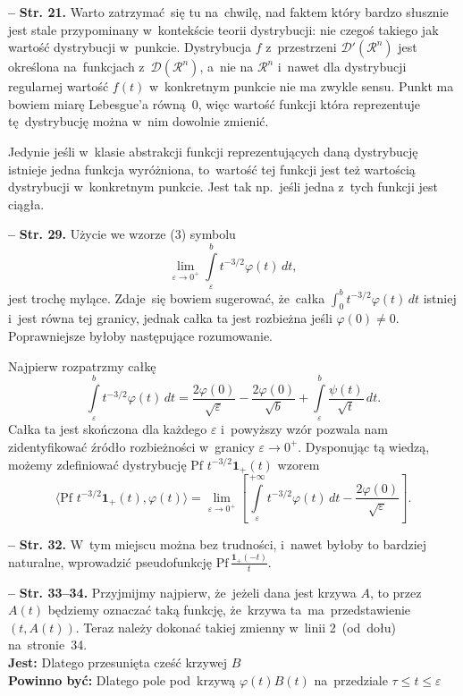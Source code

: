 \documentclass[a4paper,11pt]{article}
\newcommand{\fr}{\frac}
\newcommand{\mr}{\mathrm}
\newcommand{\mc}{\mathcal}
\newcommand{\mbf}{\mathbf}
\newcommand{\ra}{\rightarrow}
\newcommand{\veps}{\varepsilon}
\newcommand{\vp}{\varphi}
\newcommand{\D}{\mc{D}}
\newcommand{\Rc}{\mc{R}}
\newcommand{\Lim}{\lim\limits}
\newcommand{\Int}{\int\limits}
\newcommand{\lket}{\langle}
\newcommand{\rket}{\rangle}
\newcommand{\tb}{\textbf}
\newcommand{\noi}{\noindent}
\newcommand{\start}{\noi \tb{--} {}}
\newcommand{\Str}[1]{\tb{Str. #1.}}
\newcommand{\Jest}{\tb{Jest: }}
\newcommand{\Pow}{\tb{Powinno być: }}
\newcommand{\Pf}{\mr{Pf}\,}
\newcommand{\Rnc}{\Rc^{ n }}
\newcommand{\Hevp}{\mbf{1}_{ + }} %
\begin{document}
\start \Str{21} Warto zatrzymać~się tu na~chwilę, nad faktem który
bardzo słusznie jest stale przypominany w~kontekście teorii
dystrybucji: nie czegoś takiego jak wartość dystrybucji w~punkcie.
Dystrybucja $f$ z~przestrzeni $\D'( \Rnc )$ jest określona
na~funkcjach z~$\D( \Rnc )$, a~nie na $\Rnc$ i~nawet dla dystrybucji
regularnej wartość $f( t )$ w~konkretnym punkcie nie ma zwykle sensu.
Punkt ma bowiem miarę Lebesgue'a równą~0, więc wartość funkcji która
reprezentuje tę~dystrybucję można w~nim dowolnie zmienić.

Jedynie jeśli w~klasie abstrakcji funkcji reprezentujących daną
dystrybucję istnieje jedna funkcja wyróżniona, to~wartość tej funkcji
jest też wartością dystrybucji w~konkretnym punkcie. Jest tak
np.~jeśli jedna z~tych funkcji jest ciągła.

\start \Str{29} Użycie we wzorze (3) symbolu
\begin{equation}
  \label{eq:Zem-s01-01}
  \Lim_{ \veps \ra 0^{ + } } \Int_{ \veps }^{ b } t^{ -3/2 } \vp( t ) \, dt,
\end{equation}
jest trochę mylące. Zdaje~się bowiem sugerować, że~całka
$\int_{ 0 }^{ b } t^{ -3/2 } \vp( t ) \, dt$ istniej i~jest równa tej
granicy, jednak całka ta jest rozbieżna jeśli $\vp( 0 ) \neq 0$.
Poprawniejsze byłoby następujące
rozumowanie. %

Najpierw rozpatrzmy całkę
\begin{equation}
  \label{eq:Zem-s01-02}
  \Int_{ \veps }^{ b } t^{ -3/2 } \vp( t ) \, dt
  = \fr{ 2 \vp( 0 ) }{ \sqrt{ \veps } } - \fr{ 2 \vp( 0 ) }{ \sqrt{ b } }
  + \Int_{ \veps }^{ b } \fr{ \psi( t ) }{ \sqrt{ t } } \, dt.
\end{equation}
Całka ta jest skończona dla każdego $\veps$ i~powyższy wzór pozwala
nam zidentyfikować źródło rozbieżności w~granicy $\veps \ra 0^{ + }$.
Dysponując tą wiedzą, możemy zdefiniować dystrybucję
$\Pf \, t^{ -3/2 } \Hevp( t )$ wzorem
\begin{equation}
  \label{eq:Zem-s01-03}
  \lket \Pf \, t^{ -3/2 } \Hevp( t ), \vp( t ) \rket = \Lim_{ \veps \ra 0^{ + } }
  \left[ \Int_{ \veps }^{ +\infty } t^{ -3/2 } \vp( t ) \, dt
    - \fr{ 2 \vp( 0 ) }{ \sqrt{ \veps } } \right].
\end{equation}

\start \Str{32} W~tym miejscu można bez trudności, i~nawet byłoby to
bardziej naturalne, wprowadzić pseudofunkcję
$\Pf \fr{ \Hevp( -t )}{ t }$.

\start \Str{33--34} Przyjmijmy najpierw, że~jeżeli dana jest krzywa
$A$, to przez $A( t )$ będziemy oznaczać taką funkcję, że~krzywa
ta~ma~przedstawienie $( t, A( t ) )$. Teraz należy dokonać takiej
zmienny w~linii 2~(od~dołu) na~stronie~34. \\
\Jest Dlatego przesunięta cześć krzywej $B$ \\
\Pow Dlatego pole pod~krzywą $\vp( t ) B( t )$ na~przedziale
$\tau \leq t \leq \veps$
\end{document}
